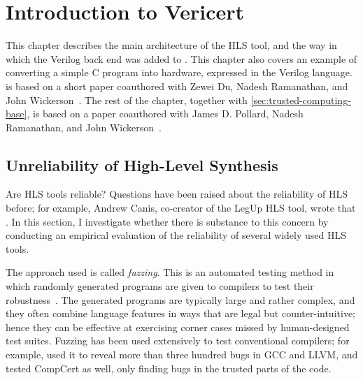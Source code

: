 \chapter{Introduction to Vericert}%
\label{sec:introduction-to-vericert}

\begin{chapsummary}
  This chapter describes the main architecture of the HLS tool, and the way in
  which the Verilog back end was added to \compcert{}.  This chapter also covers
  an example of converting a simple C program into hardware, expressed in the
  Verilog language.   is based on a short paper
  coauthored with Zewei Du, Nadesh Ramanathan, and John
  Wickerson~\cite{herklotz21_esrhlst}.  The rest of the chapter, together with
  \cref{sec:trusted-computing-base}, is based on a paper coauthored with James
  D. Pollard, Nadesh Ramanathan, and John Wickerson~\cite{herklotz21_fvhls}.
\end{chapsummary}

\section{Unreliability of High-Level Synthesis}%
\label{sec:itv:unreliability-hls}

Are \gls{HLS} tools reliable? Questions have been raised about the reliability
of HLS before; for example, Andrew Canis, co-creator of the LegUp HLS tool,
wrote that .  In this section, I
investigate whether there is substance to this concern by conducting an
empirical evaluation of the reliability of several widely used HLS tools.

The approach used is called \emph{fuzzing}.  This is an automated testing method
in which randomly generated programs are given to compilers to test their
robustness~\cite{chen13_tcf, sun16_tucbgl, liang18_f, zhang19_fubsmc,
  yang11_findin_under_bugs_c_compil, lidbury15_many_core_compil_fuzzin}.  The
generated programs are typically large and rather complex, and they often
combine language features in ways that are legal but counter-intuitive; hence
they can be effective at exercising corner cases missed by human-designed test
suites.  Fuzzing has been used extensively to test conventional compilers; for
example, \textcite{yang11_findin_under_bugs_c_compil} used it to reveal more
than three hundred bugs in GCC and LLVM, and tested CompCert as well, only
finding bugs in the trusted parts of the code.

